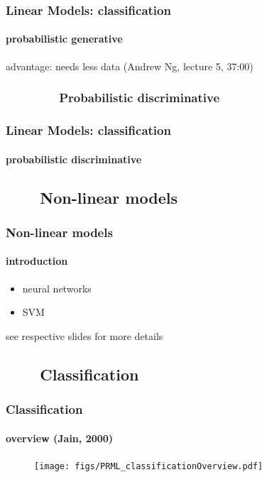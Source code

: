 \begin{frame}
\frametitle{Linear Models: classification}
\framesubtitle{probabilistic generative}
\logoCSIPCPL\mypagenum
	advantage: needs less data (Andrew Ng, lecture 5, 37:00)
\end{frame}



\subsubsection{\ \ \ \ \ \ \ \ Probabilistic discriminative}
\begin{frame}
\frametitle{Linear Models: classification}
\framesubtitle{probabilistic discriminative}
\logoCSIPCPL\mypagenum
\end{frame}


\subsection{\ \ \ \ Non-linear models}
\begin{frame}
\frametitle{Non-linear models}
\framesubtitle{introduction}
\logoCSIPCPL\mypagenum
	\begin{itemize}
		\item neural networks
		\item SVM
	\end{itemize}
	see respective slides for more details
\end{frame}


\subsection{\ \ \ \ Classification}
\begin{frame}
\frametitle{Classification}
\framesubtitle{overview (Jain, 2000)}
\mypagenum
	\begin{figure}				
		\texttt{[image: figs/PRML\_classificationOverview.pdf]}
	\end{figure}	
\end{frame}



